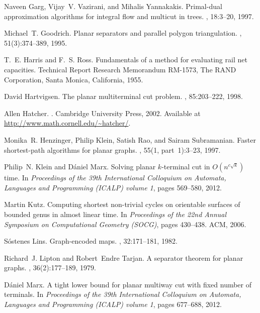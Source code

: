 \documentclass[11pt]{article}
\theoremstyle{plain}  \newtheorem{theorem}{Theorem}[section]
\theoremstyle{definition}
\begin{document}
\begin{thebibliography}{10}
Naveen Garg, Vijay~V. Vazirani, and Mihalis Yannakakis.
\newblock Primal-dual approximation algorithms for integral flow and multicut
  in trees.
, 18:3--20, 1997.

Michael~T. Goodrich.
\newblock Planar separators and parallel polygon triangulation.
, 51(3):374--389, 1995.

T.~E. Harris and F.~S. Ross.
\newblock Fundamentals of a method for evaluating rail net capacities.
\newblock Technical Report Research Memorandum RM-1573, The RAND Corporation,
  Santa Monica, California, 1955.

David Hartvigsen.
\newblock The planar multiterminal cut problem.
, 85:203--222, 1998.

Allen Hatcher.
.
\newblock Cambridge University Press, 2002.
\newblock Available at \url{http://www.math.cornell.edu/~hatcher/}.

Monika~R. Henzinger, {\relax Ph}ilip Klein, Satish Rao, and Sairam Subramanian.
\newblock Faster shortest-path algorithms for planar graphs.
, 55(1, part~1):3--23,
  1997.

{\relax Ph}ilip~N. Klein and D{\'a}niel Marx.
\newblock Solving {\sc planar $k$-terminal cut} in ${O}(n^{c\sqrt{k}})$ time.
\newblock In {\em Proceedings of the 39th International Colloquium on Automata,
  Languages and Programming (ICALP) volume 1}, pages 569--580, 2012.

Martin Kutz.
\newblock Computing shortest non-trivial cycles on orientable surfaces of
  bounded genus in almost linear time.
\newblock In {\em Proceedings of the 22nd Annual Symposium on Computational
  Geometry (SOCG)}, pages 430--438. ACM, 2006.

S{\'o}stenes Lins.
\newblock Graph-encoded maps.
, 32:171--181, 1982.

Richard~J. Lipton and Robert~Endre Tarjan.
\newblock A separator theorem for planar graphs.
, 36(2):177--189, 1979.

D{\'a}niel Marx.
\newblock A tight lower bound for planar multiway cut with fixed number of
  terminals.
\newblock In {\em Proceedings of the 39th International Colloquium on Automata,
  Languages and Programming (ICALP) volume 1}, pages 677--688, 2012.


\end{thebibliography}
\end{document}
